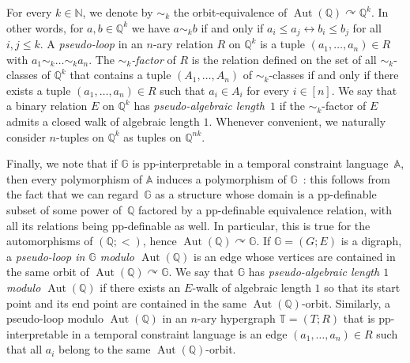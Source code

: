 \documentclass[a4paper,reqno, cleveref]{amsart}
\newcommand{\N}{\mathbb{N}}
\newcommand{\Q}{\mathbb{Q}}
\newcommand{\br}[1]{[#1]}
\newcommand{\acts}{\curvearrowright}
\DeclareMathOperator{\Aut}{Aut}
\newcommand{\sA}{\mathbb A}
\newcommand{\sG}{\mathbb G}
\newcommand{\sT}{\mathbb T}
\begin{document}
For every $k\in \N$, we denote by $\sim_k$ the orbit-equivalence of $\Aut(\Q)\acts \Q^k$. In other words, 
for $a,b\in\Q^k$ we have $a\sim_k b$ if and only if $a_i\leq a_j\leftrightarrow b_i\leq b_j$ for all $i, j \leq k$.  A \emph{pseudo-loop} in an $n$-ary relation $R$ on $\Q^k$ is a tuple $(a_1, \dots, a_n)\in R$ with $a_1 \sim_k \dots \sim_k a_n.$ The \emph{$\sim_k$-factor} of $R$ is the relation defined on the set of all ${\sim_k}$-classes of $\Q^k$ that contains a tuple $(A_1, \dots, A_n)$ of $\sim_k$-classes if and only if there exists a tuple $(a_1, \dots, a_n)\in R$ such that $a_i \in A_i$ for every $i \in \br n.$ 
We say that a binary relation $E$ on $\Q^k$ has \emph{pseudo-algebraic length~$1$} if the $\sim_k$-factor of $E$ admits a closed walk of algebraic length $1$.
Whenever convenient, we naturally consider $n$-tuples on $\Q^k$ as tuples on $\Q^{nk}.$

Finally, we note that if $\sG$ is pp-interpretable in a temporal constraint language~$\sA$, then every 
polymorphism of $\sA$ induces a polymorphism of $\sG$~\cite{JBK}: 
%
this follows from the fact that we can regard~$\sG$ as a structure whose domain is  a pp-definable subset of some power of~$\Q$ factored by  a pp-definable equivalence relation, with all its relations being pp-definable as well. In particular, this is true for the automorphisms of $(\mathbb Q; <)$, hence $\Aut(\mathbb Q)\acts \mathbb G$.
% 
If $\sG=(G;E)$ is a digraph, a \emph{pseudo-loop in $\sG$ modulo $\Aut(\Q)$} is  an edge
whose vertices are contained in the same orbit of $\Aut(\mathbb Q)\acts \mathbb G$. We say that  
$\sG$ has \emph{pseudo-algebraic length $1$ modulo $\Aut(\Q)$} if there exists an $E$-walk of algebraic length $1$ so that its start point and its end point are contained in the same $\Aut(\Q)$-orbit.  
Similarly, a pseudo-loop modulo $\Aut(\Q)$ in an $n$-ary hypergraph $\sT=(T;R)$ that is pp-interpretable in a temporal constraint language is an edge $(a_1, \dots, a_n)\in R$ such that all $a_i$ belong to the same $\Aut(\Q)$-orbit.
\end{document}
